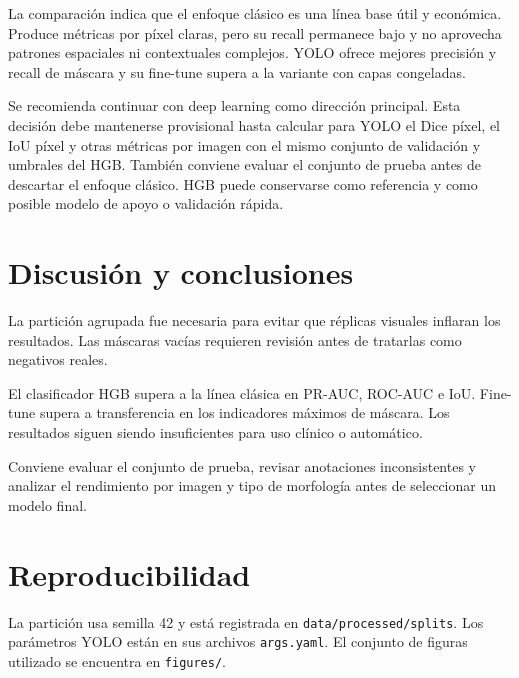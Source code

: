 \documentclass[9pt,a4paper]{article}
\begin{document}
La comparación indica que el enfoque clásico es una línea base útil y económica. Produce métricas por píxel claras, pero su recall permanece bajo y no aprovecha patrones espaciales ni contextuales complejos. YOLO ofrece mejores precisión y recall de máscara y su fine-tune supera a la variante con capas congeladas.

Se recomienda continuar con deep learning como dirección principal. Esta decisión debe mantenerse provisional hasta calcular para YOLO el Dice píxel, el IoU píxel y otras métricas por imagen con el mismo conjunto de validación y umbrales del HGB. También conviene evaluar el conjunto de prueba antes de descartar el enfoque clásico. HGB puede conservarse como referencia y como posible modelo de apoyo o validación rápida.

\section{Discusión y conclusiones}

La partición agrupada fue necesaria para evitar que réplicas visuales inflaran los resultados. Las máscaras vacías requieren revisión antes de tratarlas como negativos reales.

El clasificador HGB supera a la línea clásica en PR-AUC, ROC-AUC e IoU. Fine-tune supera a transferencia en los indicadores máximos de máscara. Los resultados siguen siendo insuficientes para uso clínico o automático.

Conviene evaluar el conjunto de prueba, revisar anotaciones inconsistentes y analizar el rendimiento por imagen y tipo de morfología antes de seleccionar un modelo final.

\section{Reproducibilidad}

La partición usa semilla 42 y está registrada en \texttt{data/processed/splits}. Los parámetros YOLO están en sus archivos \texttt{args.yaml}. El conjunto de figuras utilizado se encuentra en \texttt{figures/}.
\end{document}
